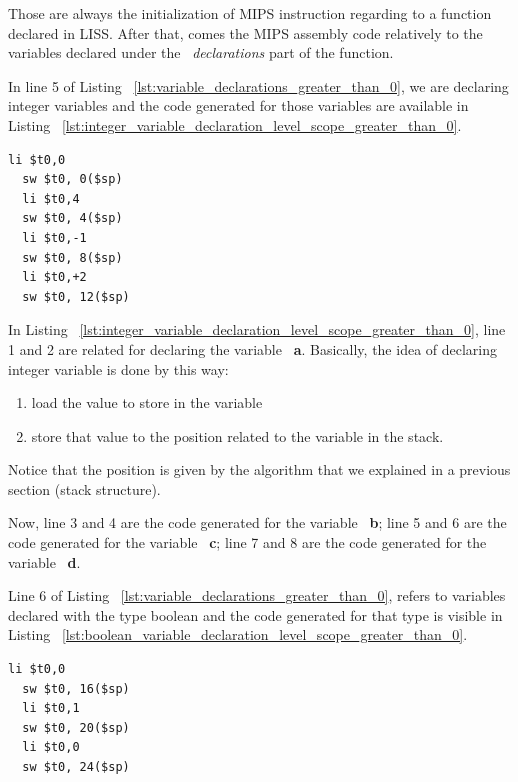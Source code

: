 \documentclass[
  oneside,
  11pt, a4paper,
  footinclude=true,
  headinclude=true,
  cleardoublepage=empty
]{scrbook}
\begin{document}
Those are always the initialization of MIPS instruction regarding to a function declared in LISS. After that, comes the MIPS assembly code relatively to the variables declared under the ~\textit{declarations} part of the function.

In line 5 of Listing ~\ref{lst:variable_declarations_greater_than_0}, we are declaring integer variables and the code generated for those variables are available in Listing ~\ref{lst:integer_variable_declaration_level_scope_greater_than_0}.

\begin{lstlisting}[caption={Declaring integer variables in level scope greater than 0 on MIPS.},label={lst:integer_variable_declaration_level_scope_greater_than_0}]
  li $t0,0		
  sw $t0, 0($sp)
  li $t0,4		
  sw $t0, 4($sp)
  li $t0,-1		
  sw $t0, 8($sp)
  li $t0,+2		
  sw $t0, 12($sp)
\end{lstlisting}

In Listing ~\ref{lst:integer_variable_declaration_level_scope_greater_than_0}, line 1 and 2 are related for declaring the variable ~\textbf{a}. Basically, the idea of declaring integer variable is done by this way: 

\begin{enumerate}
\item load the value to store in the variable
\item store that value to the position related to the variable in the stack.
\end{enumerate}

Notice that the position is given by the algorithm that we explained in a previous section (stack structure).

Now, line 3 and 4 are the code generated for the variable ~\textbf{b}; line 5 and 6 are the code generated for the variable ~\textbf{c}; line 7 and 8 are the code generated for the variable ~\textbf{d}.

Line 6 of Listing ~\ref{lst:variable_declarations_greater_than_0}, refers to variables declared with the type boolean and the code generated for that type is visible in Listing ~\ref{lst:boolean_variable_declaration_level_scope_greater_than_0}.

\begin{lstlisting}[caption={Declaring boolean variables in level scope greater than 0},label={lst:boolean_variable_declaration_level_scope_greater_than_0}]
  li $t0,0		
  sw $t0, 16($sp)
  li $t0,1		
  sw $t0, 20($sp)
  li $t0,0		
  sw $t0, 24($sp)
\end{lstlisting}
\end{document}
